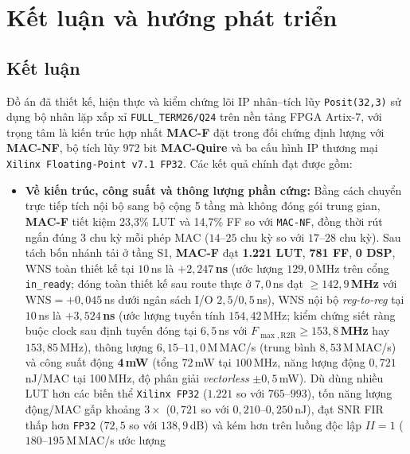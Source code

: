 \chapter{Kết luận và hướng phát triển}
\label{ch:conclusion}

\section{Kết luận}
Đồ án đã thiết kế, hiện thực và kiểm chứng lõi IP nhân--tích lũy
\texttt{Posit(32,3)} sử dụng bộ nhân lặp xấp xỉ \texttt{FULL\_TERM26/Q24} trên
nền tảng FPGA Artix-7, với trọng tâm là kiến trúc hợp nhất \textbf{MAC-F} đặt
trong đối chứng định lượng với \textbf{MAC-NF}, bộ tích lũy 972 bit \textbf{MAC-Quire}
và ba cấu hình IP thương mại \texttt{Xilinx Floating-Point v7.1 FP32}. Các kết
quả chính đạt được gồm:
\begin{itemize}
  \item \textbf{Về kiến trúc, công suất và thông lượng phần cứng:} Bằng cách chuyển
        trực tiếp tích nội bộ sang bộ cộng 5 tầng mà không đóng gói trung gian,
        \textbf{MAC-F} tiết kiệm 23,3\% LUT và 14,7\% FF so với \texttt{MAC-NF},
        đồng thời rút ngắn đúng 3 chu kỳ mỗi phép MAC ($14\text{--}25$ chu kỳ so
        với $17\text{--}28$ chu kỳ). Sau tách bốn nhánh tải ở tầng S1, \textbf{MAC-F}
        đạt \textbf{1.221 LUT}, \textbf{781 FF}, \textbf{0 DSP}, WNS toàn thiết
        kế tại $10$\,ns là \textbf{$+2{,}247$\,ns} (ước lượng $129{,}0$\,MHz trên cổng \texttt{in\_ready};
        đóng toàn thiết kế sau route thực ở $7{,}0$\,ns đạt \textbf{$\ge 142{,}9$\,MHz} với
        $\mathrm{WNS}=+0{,}045$\,ns dưới ngân sách I/O $2{,}5/0{,}5$\,ns),
        WNS nội bộ \textit{reg-to-reg} tại $10$\,ns là \textbf{$+3{,}524$\,ns} (ước lượng
        tuyến tính $154{,}42$\,MHz; kiểm chứng siết ràng buộc clock sau định tuyến đóng tại $6{,}5$\,ns với
        \textbf{$F_{\max,\mathrm{R2R}} \ge 153{,}8$\,MHz} hay $153{,}85$\,MHz), thông lượng
        $6{,}15\text{--}11{,}0$\,M\,MAC/s (trung bình $8{,}53$\,M\,MAC/s) và công suất động
        \textbf{4\,mW} (tổng $72$\,mW tại $100$\,MHz, năng
        lượng động $0{,}721$\,nJ/MAC tại 100\,MHz, độ phân giải \textit{vectorless}
        $\pm 0{,}5$\,mW). Dù dùng nhiều LUT hơn các biến thể \texttt{Xilinx FP32} ($1.221$
        so với $765\text{--}993$), tốn năng lượng động/MAC gấp khoảng $3\times$ ($0{,}721$ so với
        $0{,}210\text{--}0{,}250$\,nJ), đạt SNR FIR thấp hơn \texttt{FP32} ($72{,}5$ so với
        $138{,}9$\,dB) và kém hơn trên luồng độc lập $II=1$ ($180\text{--}195$\,M\,MAC/s ước lượng

\end{itemize}
